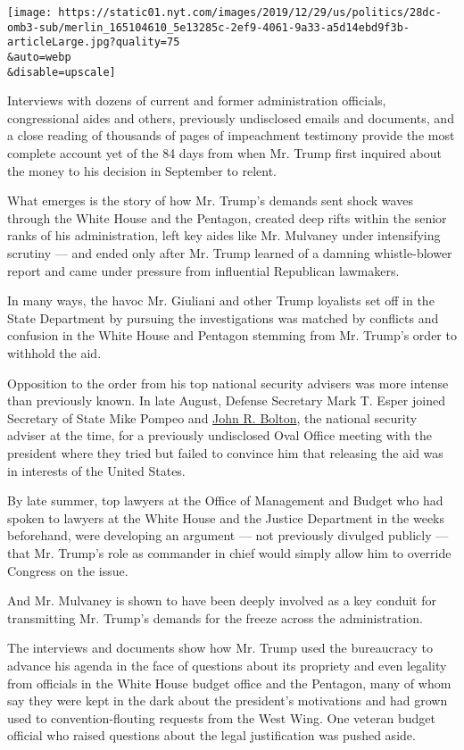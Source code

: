\texttt{[image: https://static01.nyt.com/images/2019/12/29/us/politics/28dc-omb3-sub/merlin\_165104610\_5e13285c-2ef9-4061-9a33-a5d14ebd9f3b-articleLarge.jpg?quality=75\\\&auto=webp\\\&disable=upscale]}

Interviews with dozens of current and former administration officials,
congressional aides and others, previously undisclosed emails and
documents, and a close reading of thousands of pages of impeachment
testimony provide the most complete account yet of the 84 days from when
Mr. Trump first inquired about the money to his decision in September to
relent.

What emerges is the story of how Mr. Trump's demands sent shock waves
through the White House and the Pentagon, created deep rifts within the
senior ranks of his administration, left key aides like Mr. Mulvaney
under intensifying scrutiny --- and ended only after Mr. Trump learned
of a damning whistle-blower report and came under pressure from
influential Republican lawmakers.

In many ways, the havoc Mr. Giuliani and other Trump loyalists set off
in the State Department by pursuing the investigations was matched by
conflicts and confusion in the White House and Pentagon stemming from
Mr. Trump's order to withhold the aid.

Opposition to the order from his top national security advisers was more
intense than previously known. In late August, Defense Secretary Mark T.
Esper joined Secretary of State Mike Pompeo and
\href{https://www.nytimes.com/2020/01/06/us/politics/bolton-testify-impeachment-trial.html}{John
R. Bolton}, the national security adviser at the time, for a previously
undisclosed Oval Office meeting with the president where they tried but
failed to convince him that releasing the aid was in interests of the
United States.

By late summer, top lawyers at the Office of Management and Budget who
had spoken to lawyers at the White House and the Justice Department in
the weeks beforehand, were developing an argument --- not previously
divulged publicly --- that Mr. Trump's role as commander in chief would
simply allow him to override Congress on the issue.

And Mr. Mulvaney is shown to have been deeply involved as a key conduit
for transmitting Mr. Trump's demands for the freeze across the
administration.

The interviews and documents show how Mr. Trump used the bureaucracy to
advance his agenda in the face of questions about its propriety and even
legality from officials in the White House budget office and the
Pentagon, many of whom say they were kept in the dark about the
president's motivations and had grown used to convention-flouting
requests from the West Wing. One veteran budget official who raised
questions about the legal justification was pushed aside.

